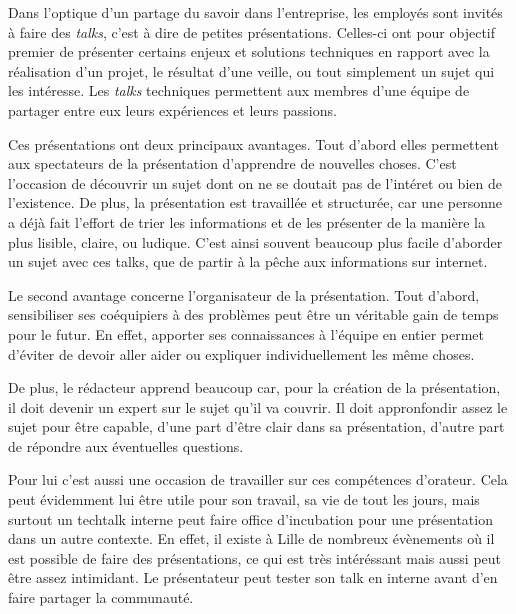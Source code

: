 \bigskip

Dans l'optique d'un partage du savoir dans l'entreprise, les employés
sont invités à faire des \emph{talks}, c'est à dire de petites
présentations. Celles-ci ont pour objectif premier de présenter certains
enjeux et solutions techniques en rapport avec la réalisation d'un
projet, le résultat d'une veille, ou tout simplement un sujet qui les
intéresse. Les \emph{talks} techniques permettent aux membres d'une
équipe de partager entre eux leurs expériences et leurs passions.

\bigskip

Ces présentations ont deux principaux avantages. Tout d'abord elles
permettent aux spectateurs de la présentation d'apprendre de nouvelles
choses. C'est l'occasion de découvrir un sujet dont on ne se doutait pas
de l'intéret ou bien de l'existence. De plus, la présentation est
travaillée et structurée, car une personne a déjà fait l'effort de trier
les informations et de les présenter de la manière la plus lisible,
claire, ou ludique. C'est ainsi souvent beaucoup plus facile d'aborder
un sujet avec ces talks, que de partir à la pêche aux informations sur
internet.

\bigskip

Le second avantage concerne l'organisateur de la présentation. Tout
d'abord, sensibiliser ses coéquipiers à des problèmes peut être un
véritable gain de temps pour le futur. En effet, apporter ses
connaissances à l'équipe en entier permet d'éviter de devoir aller aider
ou expliquer individuellement les même choses.

\bigskip

De plus, le rédacteur apprend beaucoup car, pour la création de la
présentation, il doit devenir un expert sur le sujet qu'il va couvrir.
Il doit appronfondir assez le sujet pour être capable, d'une part d'être
clair dans sa présentation, d'autre part de répondre aux éventuelles
questions.

\bigskip

Pour lui c'est aussi une occasion de travailler sur ces compétences
d'orateur. Cela peut évidemment lui être utile pour son travail, sa vie
de tout les jours, mais surtout un techtalk interne peut faire office
d'incubation pour une présentation dans un autre contexte. En effet, il
existe à Lille de nombreux évènements où il est possible de faire des
présentations, ce qui est très intéréssant mais aussi peut être assez
intimidant. Le présentateur peut tester son talk en interne avant d'en
faire partager la communauté.

